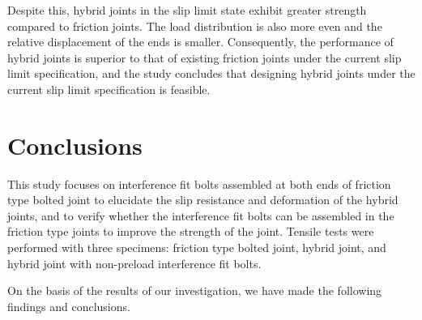 Despite this, hybrid joints in the slip limit state exhibit greater strength compared to friction joints. The load distribution is also more even and the relative displacement of the ends is smaller. Consequently, the performance of hybrid joints is superior to that of existing friction joints under the current slip limit specification, and the study concludes that designing hybrid joints under the current slip limit specification is feasible.

\section{Conclusions}

This study focuses on interference fit bolts assembled at both ends of friction type bolted joint to elucidate the slip resistance and deformation of the hybrid joints, and to verify whether the interference fit bolts can be assembled in the friction type joints to improve the strength of the joint. Tensile tests were performed with three specimens: friction type bolted joint, hybrid joint, and hybrid joint with non-preload interference fit bolts. 

On the basis of the results of our investigation, we have made the following findings and conclusions. \par


